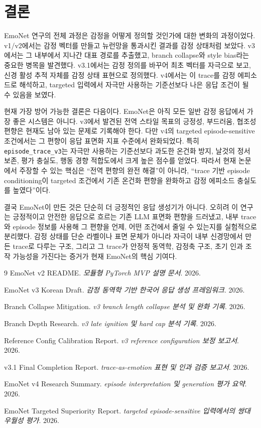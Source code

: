 \documentclass[11pt,a4paper]{article}
\newcommand{\eng}[1]{\texttt{#1}}
\begin{document}
\section{결론}

EmoNet 연구의 전체 과정은 감정을 어떻게 정의할 것인가에 대한 변화의 과정이었다. v1/v2에서는 감정 벡터를 만들고 뉴런망을 통과시킨 결과를 감정 상태처럼 보았다. v3에서는 그 내부에서 지나간 대표 경로를 추출했고, branch collapse와 style bias라는 중요한 병목을 발견했다. v3.1에서는 감정 정의를 바꾸어 최초 벡터를 자극으로 보고, 신경 활성 추적 자체를 감정 상태 표현으로 정의했다. v4에서는 이 trace를 감정 에피소드로 해석하고, targeted 입력에서 자극만 사용하는 기준선보다 나은 응답 조건이 될 수 있음을 보였다.

현재 가장 방어 가능한 결론은 다음이다. EmoNet은 아직 모든 일반 감정 응답에서 가장 좋은 시스템은 아니다. v3에서 발견된 전역 스타일 목표의 긍정성, 부드러움, 협조성 편향은 현재도 남아 있는 문제로 기록해야 한다. 다만 v4의 targeted episode-sensitive 조건에서는 그 편향이 응답 표면화 지표 수준에서 완화되었다. 특히 \eng{episode\_trace\_v3}는 자극만 사용하는 기준선보다 과도한 온건화 방지, 날것의 정서 보존, 평가 충실도, 행동 경향 적합도에서 크게 높은 점수를 얻었다. 따라서 현재 논문에서 주장할 수 있는 핵심은 ``전역 편향의 완전 해결''이 아니라, ``trace 기반 episode conditioning이 targeted 조건에서 기존 온건화 편향을 완화하고 감정 에피소드 충실도를 높였다''이다.

결국 EmoNet이 만든 것은 단순히 더 긍정적인 응답 생성기가 아니다. 오히려 이 연구는 긍정적이고 안전한 응답으로 흐르는 기존 LLM 표면화 편향을 드러냈고, 내부 trace와 episode 정보를 사용해 그 편향을 언제, 어떤 조건에서 줄일 수 있는지를 실험적으로 분리했다. 감정 상태를 단순 라벨이나 표면 문체가 아니라 자극이 내부 신경망에서 만든 trace로 다루는 구조, 그리고 그 trace가 안정적 동역학, 감정축 구조, 초기 인과 조작 가능성을 가진다는 증거가 현재 EmoNet의 핵심 기여다.

\begin{thebibliography}{9}
EmoNet v2 README. \textit{모듈형 PyTorch MVP 설명 문서}. 2026.

EmoNet v3 Korean Draft. \textit{감정 동역학 기반 한국어 응답 생성 프레임워크}. 2026.

Branch Collapse Mitigation. \textit{v3 branch length collapse 분석 및 완화 기록}. 2026.

Branch Depth Research. \textit{v3 late ignition 및 hard cap 분석 기록}. 2026.

Reference Config Calibration Report. \textit{v3 reference configuration 보정 보고서}. 2026.

v3.1 Final Completion Report. \textit{trace-as-emotion 표현 및 인과 검증 보고서}. 2026.

EmoNet v4 Research Summary. \textit{episode interpretation 및 generation 평가 요약}. 2026.

EmoNet Targeted Superiority Report. \textit{targeted episode-sensitive 입력에서의 쌍대 우월성 평가}. 2026.
\end{thebibliography}
\end{document}
